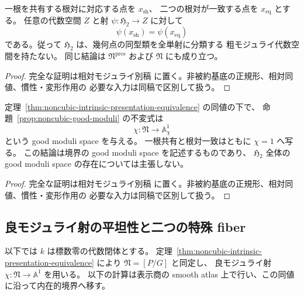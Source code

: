 \begin{corollary}
\label{cor:global-h2-no-coarse-space}
一根を共有する根対に対応する点を $x_{\mathrm{sh}}$、
二つの根対が一致する点を $x_{\mathrm{eq}}$ とする。
任意の代数空間 $Z$ と射 $\psi:\mathfrak H_2\to Z$ に対して
\[
 \psi(x_{\mathrm{sh}})=\psi(x_{\mathrm{eq}})
\]
である。従って $\mathfrak H_2$ は、幾何点の同型類を全単射に分類する
粗モジュライ代数空間を持たない。
同じ結論は $\mathfrak N^{\mathrm{pres}}$ および $\mathfrak N$ にも成り立つ。
\end{corollary}
\begin{proof}
完全な証明は相対モジュライ別稿
\cite[noncubic 境界の相対表示とモジュライ写像]{QuadricModuli2026}
に置く。非被約基底の正規形、相対同値、慣性・変形作用の
必要な入力は同稿で区別して扱う。
\end{proof}

\begin{corollary}[内在的境界の良モジュライ空間]
\label{cor:intrinsic-boundary-good-moduli}
定理~\ref{thm:noncubic-intrinsic-presentation-equivalence} の同値の下で、
命題~\ref{prop:noncubic-good-moduli} の不変式は
\[
 \chi:\mathfrak N\longrightarrow\mathbb A^1_\chi
\]
という good moduli space を与える。
一根共有と根対一致はともに $\chi=1$ へ写る。
この結論は境界の good moduli space を記述するものであり、
$\mathfrak H_2$ 全体の good moduli space の存在については主張しない。
\end{corollary}
\begin{proof}
完全な証明は相対モジュライ別稿
\cite[noncubic 境界の相対表示とモジュライ写像]{QuadricModuli2026}
に置く。非被約基底の正規形、相対同値、慣性・変形作用の
必要な入力は同稿で区別して扱う。
\end{proof}


\subsection{良モジュライ射の平坦性と二つの特殊 fiber}

以下では $k$ は標数零の代数閉体とする。
定理~\ref{thm:noncubic-intrinsic-presentation-equivalence} により $\mathfrak N=[P/G]$ と同定し、
良モジュライ射 $\chi:\mathfrak N\to\mathbb A^1$ を用いる。
以下の計算は表示商の smooth atlas 上で行い、この同値に沿って内在的境界へ移す。

